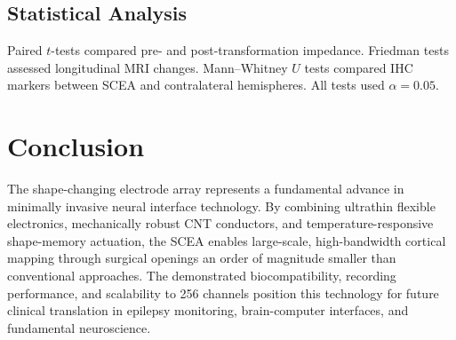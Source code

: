 \documentclass[11pt]{article}
\begin{document}
\subsection{Statistical Analysis}

Paired $t$-tests compared pre- and post-transformation impedance. Friedman tests assessed longitudinal MRI changes. Mann--Whitney $U$ tests compared IHC markers between SCEA and contralateral hemispheres. All tests used $\alpha = 0.05$.

\section{Conclusion}

The shape-changing electrode array represents a fundamental advance in minimally invasive neural interface technology. By combining ultrathin flexible electronics, mechanically robust CNT conductors, and temperature-responsive shape-memory actuation, the SCEA enables large-scale, high-bandwidth cortical mapping through surgical openings an order of magnitude smaller than conventional approaches. The demonstrated biocompatibility, recording performance, and scalability to 256 channels position this technology for future clinical translation in epilepsy monitoring, brain-computer interfaces, and fundamental neuroscience.



\end{document}
